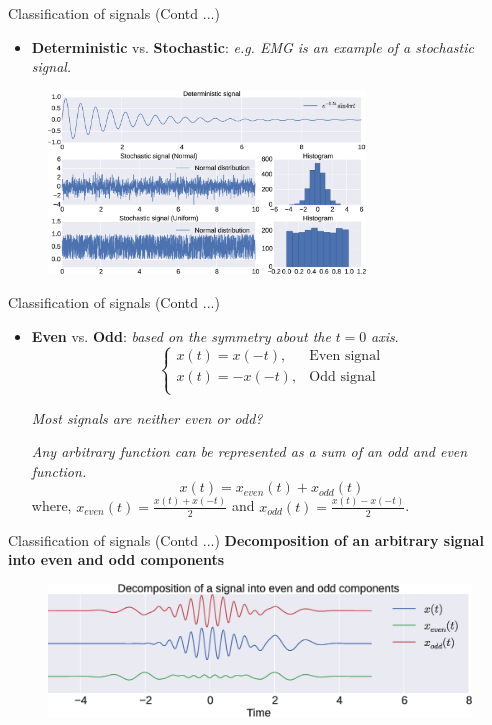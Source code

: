 \documentclass[aspectratio=169]{beamer}
\let\olditem\item
\renewcommand{\item}{\setlength{\itemsep}{\fill}\olditem}
\begin{document}
\begin{frame}{Classification of signals (Contd ...)}
\begin{itemize}
\item \textbf{Deterministic} vs. \textbf{Stochastic}: \textit{e.g. EMG is an example of a stochastic signal.}
\end{itemize}
\begin{figure}
\includegraphics[width=0.75\textwidth]{img/det_stoch.eps}
\end{figure}
\end{frame}

\begin{frame}{Classification of signals (Contd ...)}
\begin{itemize}
\item \textbf{Even} vs. \textbf{Odd}: \textit{based on the symmetry about the} $t=0$ \textit{axis}.
\[\begin{cases}
x(t) = x(-t), & \text{Even signal} \\
x(t) = -x(-t), & \text{Odd signal} \\
\end{cases}\]

\textit{Most signals are neither even or odd?}

\begin{tcolorbox}[width=0.9\textwidth,colback={lightgray},title={\textbf{Theorem}},colbacktitle=black,coltitle=white]
\textit{Any arbitrary function can be represented as a sum of an odd and even function.}
\[ x(t) = x_{even}(t) + x_{odd}(t) \]
where, $ x_{even}(t) = \frac{x(t) + x(-t)}{2} $ and $ x_{odd}(t) = \frac{x(t) - x(-t)}{2} $.
\end{tcolorbox}
\end{itemize}
\end{frame}

\begin{frame}[t]{Classification of signals (Contd ...)}
\textbf{Decomposition of an arbitrary signal into even and odd components}
\begin{figure}
\includegraphics[width=\textwidth]{img/even_odd.eps}
\end{figure}
\end{frame}
\end{document}
